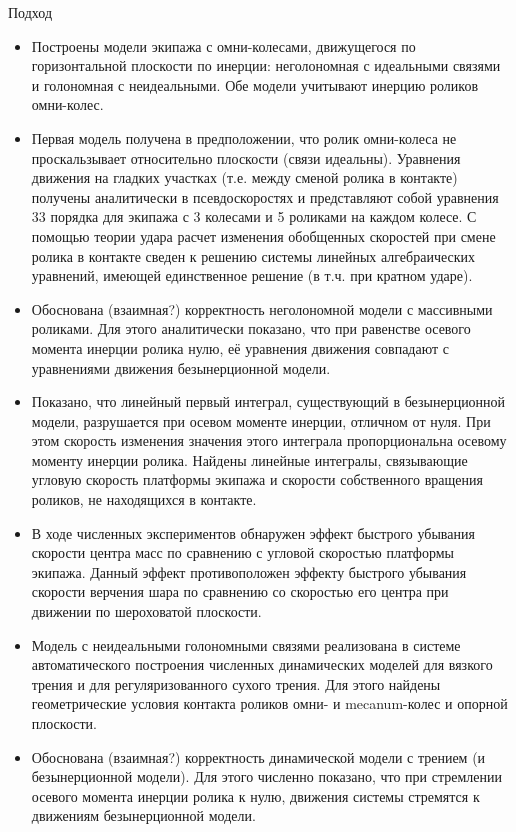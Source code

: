 \begin{frame}{Подход}
    \begin{itemize}
        \item {
            Построены модели экипажа с омни-колесами, движущегося по горизонтальной плоскости по инерции: неголономная с идеальными связями и голономная с неидеальными. Обе модели учитывают инерцию роликов омни-колес.
        }
        \item {
            Первая модель получена в предположении, что ролик омни-колеса не проскальзывает относительно плоскости (связи идеальны). Уравнения движения на гладких участках  (т.е. между сменой ролика в контакте) получены аналитически в псевдоскоростях и представляют собой уравнения 33 порядка для экипажа с 3 колесами и 5 роликами на каждом колесе. С помощью теории удара расчет изменения обобщенных скоростей при смене ролика в контакте сведен к решению системы линейных алгебраических уравнений, имеющей единственное решение (в т.ч. при кратном ударе).
        }
        \item {
            Обоснована (взаимная?) корректность неголономной модели с массивными роликами. Для этого аналитически показано, что при равенстве осевого момента инерции ролика нулю, её уравнения движения совпадают с уравнениями движения безынерционной модели.
        }
        \item {
            Показано, что линейный первый интеграл, существующий в безынерционной модели, разрушается при осевом моменте инерции, отличном от нуля. При этом скорость изменения значения этого интеграла пропорциональна осевому моменту инерции ролика. Найдены линейные интегралы, связывающие угловую скорость платформы экипажа и скорости собственного вращения роликов, не находящихся в контакте.
        }
        \item {
            В ходе численных экспериментов обнаружен эффект быстрого убывания скорости центра масс по сравнению с угловой скоростью платформы экипажа. Данный эффект противоположен эффекту быстрого убывания скорости верчения шара по сравнению со скоростью его центра при движении по шероховатой плоскости.
        }
        \item {
            Модель с неидеальными голономными связями реализована в системе автоматического построения численных динамических моделей для вязкого трения и для регуляризованного сухого трения. Для этого найдены геометрические условия контакта роликов омни- и mecanum-колес и опорной плоскости.
        }
        \item {
            Обоснована (взаимная?) корректность динамической модели с трением (и безынерционной модели). Для этого численно показано, что при стремлении осевого момента инерции ролика к нулю, движения системы стремятся к движениям безынерционной модели.
}
\end{itemize}
\end{frame}
